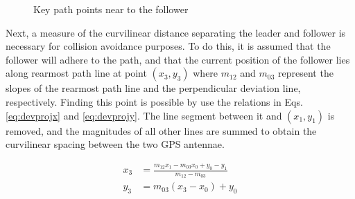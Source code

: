 \begin{figure}[ht] \centering
{}
\caption{Key path points near to the follower} \label{fig:pathpts}
\end{figure}

Next, a measure of the curvilinear distance separating the leader and follower is necessary for collision avoidance purposes. To do this, it is assumed that the follower will adhere to the path, and that the current position of the follower lies along rearmost path line at point $(x_3, y_3)$ where $m_{12}$ and $m_{03}$ represent the slopes of the rearmost path line and the perpendicular deviation line, respectively. Finding this point is possible by use the relations in Eqs. \eqref{eq:devprojx} and \eqref{eq:devprojy}. The line segment between it and $(x_1,y_1)$ is removed, and the magnitudes of all other lines are summed to obtain the curvilinear spacing between the two GPS antennae. 

\begin{align} 
    x_3 &= \frac{ m_{12} x_1 - m_{03} x_0 + y_0 - y_1 } { m_{12} - m_{03} } \label{eq:devprojx} \\
    y_3 &= m_{03} (x_3 - x_0) + y_0 \label{eq:devprojy}
\end{align}

